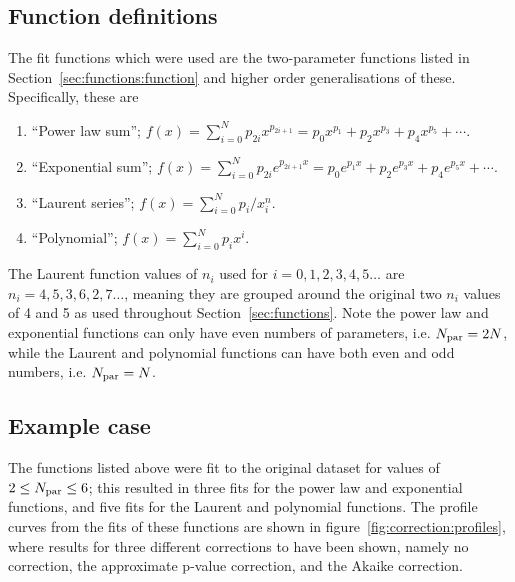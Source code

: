 \subsection{Function definitions}
\label{sec:correction:functions}
The fit functions which were used are the two-parameter functions listed in
Section~\ref{sec:functions:function} and higher order generalisations of
these. Specifically, these are
\begin{enumerate}
\item
``Power law sum''; $f(x) = \sum_{i=0}^N p_{2i} x^{p_{2i+1}} = p_{0}x^{p_{1}} + p_{2}x^{p_{3}} + p_{4}x^{p_{5}}+\cdots$.
\item
``Exponential sum''; $f(x) = \sum_{i=0}^N p_{2i} e^{p_{2i+1}x} = p_{0} e^{p_{1}x} + p_{2} e^{p_{3}x} + p_{4} e^{p_{5}x}+\cdots$.
\item
``Laurent series''; $f(x) = \sum_{i=0}^N p_i/x^n_{i}$.
\item
``Polynomial''; $f(x) = \sum_{i=0}^N p_i x^i$.
\end{enumerate}
The Laurent function values of $n_{i}$ used for $i=0,1,2,3,4,5\dots$ are
$n_{i}=4,5,3,6,2,7\dots$, meaning they are grouped around the original
two $n_{i}$ values of 4 and 5 as used throughout Section~\ref{sec:functions}.
Note the power law and exponential functions can only have even numbers of
parameters, i.e. $N_{\rm par}=2N$, while the Laurent and polynomial functions
can have both even and odd numbers, i.e. $N_{\rm par}=N$.


\subsection{Example case}
\label{sec:correction:example}

The functions listed above were fit to the original dataset for values of
$2 \le N_{\rm par} \le 6$; this resulted in three fits for the power law and
exponential functions, and five fits for the Laurent and polynomial functions.
The profile curves from the fits of these functions are shown in
figure~\ref{fig:correction:profiles}, where results for three different
corrections to \nll have been shown, namely no correction, the approximate
p-value correction, and the Akaike correction.

